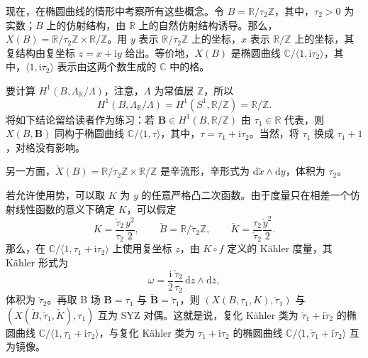 \begin{example}\label{ex:6.22}
现在，在椭圆曲线的情形中考察所有这些概念。令 $B=\mathbb R/\tau_2\mathbb Z$，其中，$\tau_2>0$ 为实数；$B$ 上的仿射结构，由 $\mathbb R$ 上的自然仿射结构诱导。那么，$X(B)=\mathbb R/\tau_2\mathbb Z\times\mathbb R/\mathbb Z$。用 $y$ 表示 $\mathbb R/\tau_2\mathbb Z$ 上的坐标，$x$ 表示 $\mathbb R/\mathbb Z$ 上的坐标，其复结构由复坐标 $z=x+\mathrm i y$ 给出。等价地，$X(B)$ 是椭圆曲线 $\mathbb C/\langle1,\mathrm i\tau_2\rangle$，其中，$\langle1,\mathrm i\tau_2\rangle$ 表示由这两个数生成的 $\mathbb C$ 中的格。

要计算 $H^1(B,\Lambda_{\mathbb R}/\Lambda)$，注意，$\Lambda$ 为常值层 $\mathbb Z$，所以
\[
H^1(B,\Lambda_{\mathbb R}/\Lambda)
=H^1(S^1,\mathbb R/\mathbb Z)=\mathbb R/\mathbb Z.
\]
将如下结论留给读者作为练习：若 $\mathbf B\in H^1(B,\mathbb R/\mathbb Z)$ 由 $\tau_1\in\mathbb R$ 代表，则 $X(B,\mathbf B)$ 同构于椭圆曲线 $\mathbb C/\langle1,\tau\rangle$，其中，$\tau=\tau_1+\mathrm i\tau_2$。当然，将 $\tau_1$ 换成 $\tau_1+1$，对格没有影响。

另一方面，$\check X(B)=\mathbb R/\tau_2\mathbb Z\times\mathbb R/\mathbb Z$ 是辛流形，辛形式为 $\mathrm d\check x\wedge\mathrm dy$，体积为 $\tau_2$。

若允许使用势，可以取 $K$ 为 $y$ 的任意严格凸二次函数。由于度量只在相差一个仿射线性函数的意义下确定 $K$，可以假定
\[
K=\frac{\check\tau_2}{\tau_2}\frac{y^2}{2},
\qquad
\check B=\mathbb R/\check\tau_2\mathbb Z,
\qquad
\check K=\frac{\tau_2}{\check\tau_2}\frac{\check y^2}{2}.
\]
那么，在 $\mathbb C/\langle1,\tau_1+\mathrm i\tau_2\rangle$ 上使用复坐标 $z$，由 $K\circ f$ 定义的 Kähler 度量，其 Kähler 形式为
\[
\omega=\frac{\mathrm i}{2}\frac{\check\tau_2}{\tau_2}\,
\mathrm dz\wedge\mathrm d\bar z,
\]
体积为 $\check\tau_2$。再取 B 场 $\mathbf B=\tau_1$ 与 $\check{\mathbf B}=\check\tau_1$，则 $(X(B,\tau_1,K),\check\tau_1)$ 与 $(X(\check B,\check\tau_1,\check K),\tau_1)$ 互为 SYZ 对偶。这就是说，复化 Kähler 类为 $\check\tau_1+\mathrm i\check\tau_2$ 的椭圆曲线 $\mathbb C/\langle1,\tau_1+\mathrm i\tau_2\rangle$，与复化 Kähler 类为 $\tau_1+\mathrm i\tau_2$ 的椭圆曲线 $\mathbb C/\langle1,\check\tau_1+\mathrm i\check\tau_2\rangle$ 互为镜像。
\end{example}

